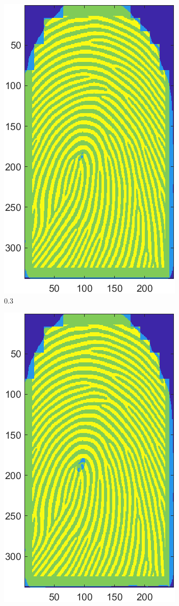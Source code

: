 \documentclass[a4paper]{article}
\begin{document}
\begin{figure}[h!]
\begin{subfigure}[t]{0.2\textwidth}
         \includegraphics[scale=0.5]{Figures/E4-e2-0.3}
         \caption{\(0.3\)}
     \end{subfigure}
     \begin{subfigure}[t]{0.2\textwidth}
      \centering
      \includegraphics[scale=0.5]{Figures/E4-e2-0.6}

\end{subfigure}
\end{figure}
\end{document}
